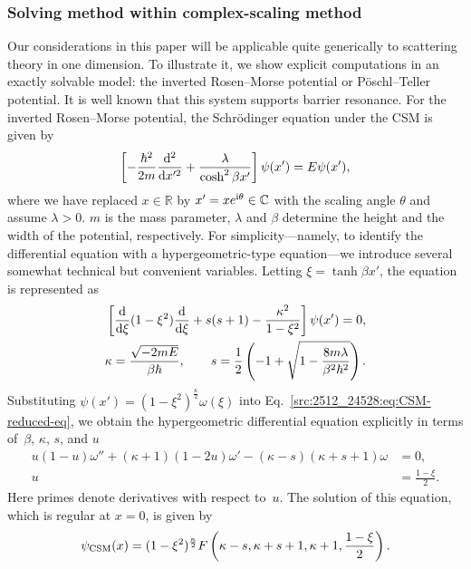\subsubsection{Solving method within complex-scaling method}
Our considerations in this paper will be applicable quite generically to scattering theory in one dimension. To illustrate it, we show explicit computations in an exactly solvable model: the inverted Rosen--Morse potential or P\"oschl--Teller potential. It is well known that this system supports barrier resonance.
For the inverted Rosen--Morse potential, the Schr\"{o}dinger equation under the CSM is given by
\begin{align}
    \left[-\frac{\hbar^2}{2m} \frac{\mathrm{d}^2}{\mathrm{d} x'^2} + \frac{\lambda}{\cosh^2 \beta x'}\right] \psi(x')
    = E \psi(x') ,
    \label{src:2512_24528:eq:CSM-eq}
\end{align}
where we have replaced $x\in\mathbb{R}$ by $x'=xe^{\mathrm{i} \theta}\in\mathbb{C}$ with the scaling angle $\theta$ and assume $\lambda>0$.
$m$ is the mass parameter, $\lambda$ and $\beta$ determine the height and the width of the potential, respectively.
For simplicity---namely, to identify the differential equation with a hypergeometric-type equation---we introduce several somewhat technical but convenient variables.
Letting $\xi=\tanh\beta x'$, the equation is represented as
\begin{align}
    \left[ \frac{\mathrm{d}}{\mathrm{d} \xi} (1-\xi^2)\frac{\mathrm{d}}{\mathrm{d} \xi} +s(s+1) - \frac{\kappa^2}{1-\xi^2} \right] \psi(x')
    = 0 ,\\
    \kappa = \frac{\sqrt{-2mE}}{\beta\hbar},
    \qquad
    s = \frac{1}{2} \left(-1 + \sqrt{1-\frac{8m\lambda}{\beta^2\hbar^2}}\right).
    \label{src:2512_24528:eq:CSM-reduced-eq}
\end{align}
Substituting $\psi(x')=(1-\xi^2)^{\frac{\kappa}{2}}\omega(\xi)$ into Eq.~\eqref{src:2512_24528:eq:CSM-reduced-eq}, we obtain the hypergeometric differential equation explicitly in terms of~$\beta$, $\kappa$, $s$, and $u$
\begin{align}
    u(1-u)\omega''+(\kappa+1)(1-2u)\omega'
    -(\kappa-s)(\kappa+s+1)\omega&=0,
    \\
    u&=\frac{1-\xi}{2}.
\end{align}
Here primes denote derivatives with respect to~$u$.
The solution of this equation, which is regular at $x=0$, is given by
\begin{align}
    \psi_{\mathrm{CSM}}(x)= (1-\xi^2)^{\frac{\kappa}{2}} 
    F\left( \kappa-s, \kappa+s+1, \kappa+1, \frac{1-\xi}{2} \right).
\end{align}
